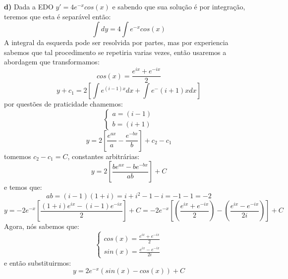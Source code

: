 \textbf{d)} Dada a EDO $y' = 4e^{-x}cos(x)$ e sabendo que sua solução é por integração, teremos que esta é separável então:
\begin{equation*}
    \int dy = 4\int e^{-x}cos(x)
\end{equation*}
A integral da esquerda pode ser resolvida por partes, mas por experiencia sabemos que tal procedimento se repetiria varias vezes, então usaremos a abordagem que transformamos:
\begin{equation*}
    cos(x) = \frac{e^{ix} + e^{-ix}}{2}
\end{equation*}
\begin{equation*}
    y + c_1= 2\left[\int e^{(i-1)x}dx + \int e^-(i+1)x dx \right]
\end{equation*}
por questões de praticidade chamemos:
\begin{equation*}
    \begin{cases}
    a = (i-1)\\
    b = (i+1)
    \end{cases}
\end{equation*}
\begin{equation*}
    y = 2\left[\frac{e^{ax}}{a} - \frac{e^{-bx}}{b}\right] + c_2 - c_1
\end{equation*}
tomemos $c_2 - c_1 = C$, constantes arbitrárias:
\begin{equation*}
    y = 2\left[\frac{be^{ax} - be^{-bx}}{ab}\right] + C    
\end{equation*}
e temos que:
\begin{equation*}
    ab = (i-1)(1+i) = i + i^2 -1 - i = -1 -1 = -2 
\end{equation*}
\begin{equation*}
    y = -2e^{-x}\left[\frac{(1+i)e^{ix}-(i-1)e^{-ix}}{2}\right] + C = -2e^{-x}\left[\left(\frac{e^{ix}+e^{-ix}}{2}\right) - \left(\frac{e^{ix}-e^{-ix}}{2i}\right)\right]+C
\end{equation*}
Agora, nós sabemos que:
\begin{equation*}
    \begin{cases}
        cos(x) = \frac{e^{ix} + e^{-ix}}{2}\\
        sin(x) = \frac{e^{ix} - e^{-ix}}{2i}
    \end{cases}
\end{equation*}
e então substituirmos:
\begin{equation*}
    \boxed{y = 2e^{-x}\left(sin(x) - cos(x)\right)+C}
\end{equation*}

